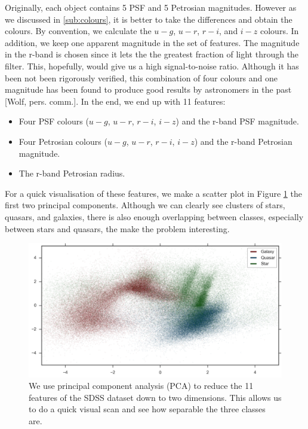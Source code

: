 Originally, each object contains 5 PSF and 5 Petrosian magnitudes.
However as we discussed
in \ref{sub:colours}, it is better to take the differences and obtain the colours. By convention, we calculate the $u-g$, $u-r$, $r-i$,
and $i-z$ colours. In addition, we keep one apparent magnitude in the set of features.
The magnitude in the r-band is chosen since it lets the the greatest fraction of light through
the filter. This, hopefully, would give us a high signal-to-noise ratio.
Although it has been not been rigorously verified, this combination of four colours and
one magnitude has been found to produce good results by astronomers in the past [Wolf, pers. comm.].
In the end, we end up with 11 features:
\begin{itemize}
	\item Four PSF colours ($u-g$, $u-r$, $r-i$, $i-z$) and the r-band PSF magnitude.
	\item Four Petrosian colours ($u-g$, $u-r$, $r-i$, $i-z$) and the r-band Petrosian magnitude.
	\item The r-band Petrosian radius.
\end{itemize}
For a quick visualisation of these features, we make a scatter
plot in Figure \ref{fig:sdss_pca_all}
the first two principal components. Although we can clearly see clusters of stars, quasars, 
and galaxies, there is also enough  overlapping between classes, especially between
stars and quasars, the make the problem interesting.

\begin{figure}[tbp]
	\centering
	\includegraphics[width=\textwidth]{figures/4_expt1/sdss_pca_all}
	\caption[First two principcal components of the SDSS dataset]{We use principal
		component analysis (PCA) to reduce the 11 features of the SDSS dataset down
		to two dimensions. This allows us to do a quick visual scan and see how
		separable the three classes are.}
	\label{fig:sdss_pca_all}
\end{figure}


